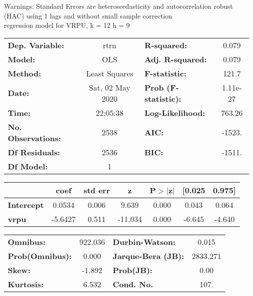 Warnings: \newline
 [1] Standard Errors are heteroscedasticity and autocorrelation robust (HAC) using 1 lags and without small sample correction\\ 

regression model for VRPU, k = 12 h = 9\begin{center}
\begin{tabular}{lclc}
\toprule
\textbf{Dep. Variable:}    &       rtrn       & \textbf{  R-squared:         } &     0.079   \\
\textbf{Model:}            &       OLS        & \textbf{  Adj. R-squared:    } &     0.079   \\
\textbf{Method:}           &  Least Squares   & \textbf{  F-statistic:       } &     121.7   \\
\textbf{Date:}             & Sat, 02 May 2020 & \textbf{  Prob (F-statistic):} &  1.11e-27   \\
\textbf{Time:}             &     22:05:38     & \textbf{  Log-Likelihood:    } &    763.26   \\
\textbf{No. Observations:} &        2538      & \textbf{  AIC:               } &    -1523.   \\
\textbf{Df Residuals:}     &        2536      & \textbf{  BIC:               } &    -1511.   \\
\textbf{Df Model:}         &           1      & \textbf{                     } &             \\
\bottomrule
\end{tabular}
\begin{tabular}{lcccccc}
                   & \textbf{coef} & \textbf{std err} & \textbf{z} & \textbf{P$> |$z$|$} & \textbf{[0.025} & \textbf{0.975]}  \\
\midrule
\textbf{Intercept} &       0.0534  &        0.006     &     9.639  &         0.000        &        0.043    &        0.064     \\
\textbf{vrpu}      &      -5.6427  &        0.511     &   -11.034  &         0.000        &       -6.645    &       -4.640     \\
\bottomrule
\end{tabular}
\begin{tabular}{lclc}
\textbf{Omnibus:}       & 922.036 & \textbf{  Durbin-Watson:     } &    0.015  \\
\textbf{Prob(Omnibus):} &   0.000 & \textbf{  Jarque-Bera (JB):  } & 2833.271  \\
\textbf{Skew:}          &  -1.892 & \textbf{  Prob(JB):          } &     0.00  \\
\textbf{Kurtosis:}      &   6.532 & \textbf{  Cond. No.          } &     107.  \\
\bottomrule
\end{tabular}
\end{center}

